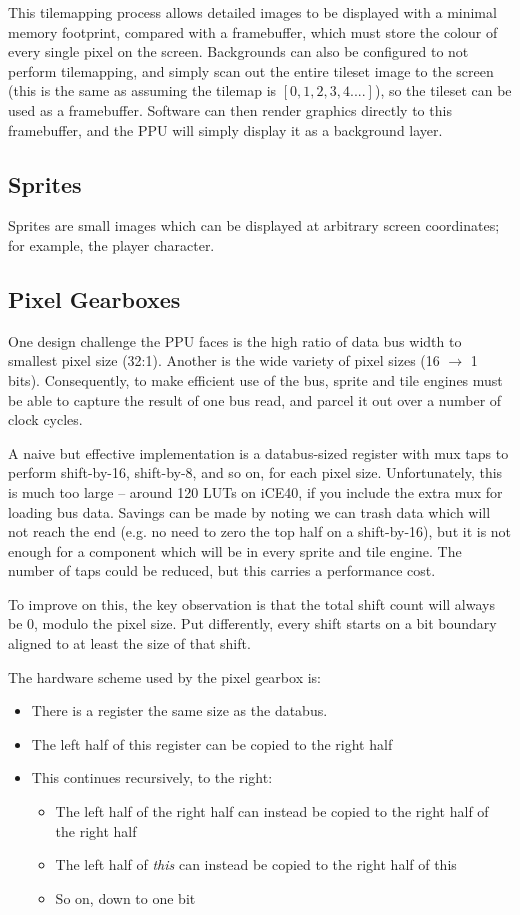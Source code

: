 This tilemapping process allows detailed images to be displayed with a minimal memory footprint, compared with a framebuffer, which must store the colour of every single pixel on the screen. Backgrounds can also be configured to not perform tilemapping, and simply scan out the entire tileset image to the screen (this is the same as assuming the tilemap is $[0, 1, 2, 3, 4....]$), so the tileset can be used as a framebuffer. Software can then render graphics directly to this framebuffer, and the PPU will simply display it as a background layer.

\subsection{Sprites}

Sprites are small images which can be displayed at arbitrary screen coordinates; for example, the player character.

\subsection{Pixel Gearboxes}

One design challenge the PPU faces is the high ratio of data bus width to smallest pixel size (32:1). Another is the wide variety of pixel sizes (16 $\to$ 1 bits). Consequently, to make efficient use of the bus, sprite and tile engines must be able to capture the result of one bus read, and parcel it out over a number of clock cycles.

A naive but effective implementation is a databus-sized register with mux taps to perform shift-by-16, shift-by-8, and so on, for each pixel size. Unfortunately, this is much too large -- around 120 LUTs on iCE40, if you include the extra mux for loading bus data. Savings can be made by noting we can trash data which will not reach the end (e.g. no need to zero the top half on a shift-by-16), but it is not enough for a component which will be in every sprite and tile engine. The number of taps could be reduced, but this carries a performance cost.

To improve on this, the key observation is that the total shift count will always be 0, modulo the pixel size. Put differently, every shift starts on a bit boundary aligned to at least the size of that shift.

The hardware scheme used by the pixel gearbox is:
\begin{itemize}
	\item There is a register the same size as the databus.
	\item The left half of this register can be copied to the right half
	\item This continues recursively, to the right:
	\begin{itemize}
		\item The left half of the right half can instead be copied to the right half of the right half
		\item The left half of {\it this} can instead be copied to the right half of this
		\item So on, down to one bit
	\end{itemize}
\end{itemize}

